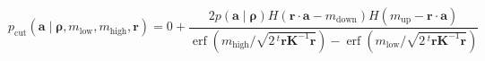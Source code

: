 \documentclass{article}
\newcommand{\inprod}[2]{\ensuremath{#1 \cdot #2}}
\newcommand{\pr}[1]{\left(#1\right)}
\newcommand{\tr}[1]{\ensuremath{\,{}^{t}\!#1}}
\DeclareMathOperator{\erf}{erf}
\newcommand{\Kst}{\ensuremath{\bm{K}}}
\newcommand{\hyper}{\ensuremath{\bm{\rho}}}
\begin{document}
\begin{equation}
  \label{eq:34}
    p_{\mathrm{cut}}\pr{\bm{a} \mid \hyper, m_{\mathrm{low}}, m_{\mathrm{high}}, \bm{r}}
    =0+
    \frac{
      2p\pr{\bm{a} \mid \hyper}
      H\pr{\inprod{\bm{r}}{\bm{a}} - m_{\mathrm{down}}}
      H\pr{m_{\mathrm{up}} - \inprod{\bm{r}}{\bm{a}}}
    }{
      \erf{\pr{m_{\mathrm{high}}/\sqrt{2\tr{\bm{r}}\Kst^{-1}\bm{r}}}}
      -
      \erf{\pr{m_{\mathrm{low}}/\sqrt{2\tr{\bm{r}}\Kst^{-1}\bm{r}}}}
    }
\end{equation}
\end{document}
